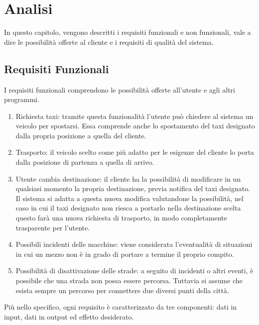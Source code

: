 
\chapter{Analisi}

In questo capitolo, vengono descritti i requisiti funzionali e non funzionali, vale a dire le possibilità offerte al cliente e i requisiti di qualità del sistema.

\section{Requisiti Funzionali}\label{requisiti_funzionali}

I requisiti funzionali comprendono le possibilità offerte all'utente e agli altri programmi.

\begin{enumerate}
	\item Richiesta taxi: tramite questa funzionalità l'utente può chiedere al sistema un veicolo per spostarsi. Essa comprende anche lo spostamento del taxi designato dalla propria posizione a quella del cliente.
	\item Trasporto: il veicolo scelto come più adatto per le esigenze del cliente lo porta dalla posizione di partenza a quella di arrivo.
	\item Utente cambia destinazione: il cliente ha la possibilità di modificare in un qualsiasi momento la propria destinazione, previa notifica del taxi designato. Il sistema si adatta a questa nuova modifica valutandone la possibilità, nel caso in cui il taxi designato non riesca a portarlo nella destinazione scelta questo farà una nuova richiesta di trasporto, in modo completamente trasparente per l'utente.
	\item Possibili incidenti delle macchine: viene considerata l'eventualità di situazioni in cui un mezzo non è in grado di portare a termine il proprio compito.
	\item Possibilità di disattivazione delle strade: a seguito di incidenti o altri eventi, è possibile che una strada non possa essere percorsa. Tuttavia si assume che esista sempre un percorso per connettere due diversi punti della città.
\end{enumerate}

Più nello specifico, ogni requisito è caratterizzato da tre componenti: dati in input, dati in output ed effetto desiderato.

